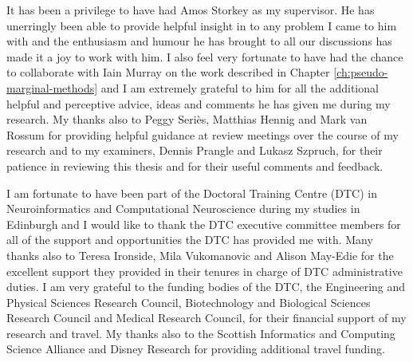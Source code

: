 
\enlargethispage{2\baselineskip}



It has been a privilege to have had Amos Storkey as my supervisor. He has unerringly been able to provide helpful insight in to any problem I came to him with and the enthusiasm and humour he has brought to all our discussions has made it a joy to work with him. I also feel very fortunate to have had the chance to collaborate with Iain Murray on the work described in Chapter \ref{ch:pseudo-marginal-methods} and I am extremely grateful to him for all the additional helpful and perceptive advice, ideas and comments he has given me during my research. My thanks also to Peggy Seri\`{e}s, Matthias Hennig and Mark van Rossum for providing helpful guidance at review meetings over the course of my research and to my examiners, Dennis Prangle and Lukasz Szpruch, for their patience in reviewing this thesis and for their useful comments and feedback.




I am fortunate to have been part of the Doctoral Training Centre (DTC) in Neuroinformatics and Computational Neuroscience during my studies in Edinburgh and I would like to thank the DTC executive committee members for all of the support and opportunities the DTC has provided me with. Many thanks also to Teresa Ironside, Mila Vukomanovic and Alison May-Edie for the excellent support they provided in their tenures in charge of DTC administrative duties. I am  very grateful to the funding bodies of the DTC, the Engineering and Physical Sciences Research Council, Biotechnology and Biological Sciences Research Council and Medical Research Council, for their financial support of my research and travel. My thanks also to the Scottish Informatics and Computing Science Alliance and Disney Research for providing additional travel funding.

